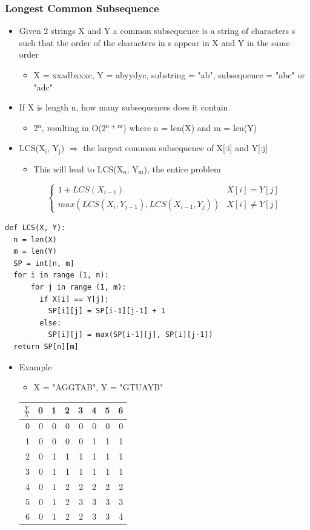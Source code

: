 \documentclass[11pt]{article}
\begin{document}
\subsubsection*{Longest Common Subsequence}
\label{sec:org515317b}
\begin{itemize}
\item Given 2 strings X and Y a common subsequence is a string of characters s such that the order of the characters in s appear in X and Y in the same order
\begin{itemize}
\item X = xxadbxxxc, Y = abyydyc, substring = "ab", subsequence = "abc" or "adc"
\end{itemize}
\item If X is length n, how many subsequences does it contain
\begin{itemize}
\item 2\(^{\text{n}}\), resulting in O(2\(^{\text{n + m}}\)) where n = len(X) and m = len(Y)
\end{itemize}
\item LCS(X\(_{\text{i}}\), Y\(_{\text{j}}\)) \(\Rightarrow\) the largest common subsequence of X[:i] and Y[:j]
\begin{itemize}
\item This will lead to LCS(X\(_{\text{n}}\), Y\(_{\text{m}}\)), the entire problem
\end{itemize}
\[ \begin{cases} 
        1 + LCS(X_{i - 1}) & X[i] = Y[j]\\
        max(LCS(X_i, Y_{j - 1}), LCS(X_{i - 1}, Y_j)) & X[i] \ne Y[j]
        \end{cases}
      \]
\end{itemize}
\begin{verbatim}
def LCS(X, Y):
  n = len(X)
  m = len(Y)
  SP = int[n, m]
  for i in range (1, n):
      for j in range (1, m):
        if X[i] == Y[j]:
          SP[i][j] = SP[i-1][j-1] + 1
        else:
          SP[i][j] = max(SP[i-1][j], SP[i][j-1])
  return SP[n][m]
\end{verbatim}
\begin{itemize}
\item Example
\label{sec:org1c86c5d}
\begin{itemize}
\item X = "AGGTAB", Y = "GTUAYB"
\end{itemize}
\begin{center}
\begin{tabular}{rrrrrrrr}
\(\frac{Y}{X}\) & 0 & 1 & 2 & 3 & 4 & 5 & 6\\
\hline
0 & 0 & 0 & 0 & 0 & 0 & 0 & 0\\
1 & 0 & 0 & 0 & 0 & 1 & 1 & 1\\
2 & 0 & 1 & 1 & 1 & 1 & 1 & 1\\
3 & 0 & 1 & 1 & 1 & 1 & 1 & 1\\
4 & 0 & 1 & 2 & 2 & 2 & 2 & 2\\
5 & 0 & 1 & 2 & 3 & 3 & 3 & 3\\
6 & 0 & 1 & 2 & 2 & 3 & 3 & 4\\
\end{tabular}
\end{center}
\end{itemize}
\end{document}
